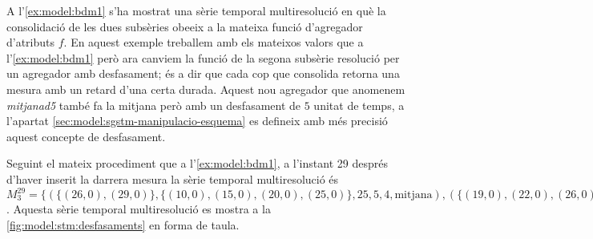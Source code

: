 \begin{example} 
\label{ex:model:bdm-desfasaments}

A l'\autoref{ex:model:bdm1} s'ha mostrat una sèrie temporal
multiresolució en què la consolidació de les dues subsèries obeeix
a la mateixa funció d'agregador d'atributs $f$. En aquest exemple
treballem amb els mateixos valors que a l'\autoref{ex:model:bdm1} però
ara canviem la funció de la segona subsèrie resolució per un agregador
amb desfasament; és a dir que cada cop que consolida retorna una
mesura amb un retard d'una certa durada. Aquest nou agregador que
anomenem \emph{mitjanad5} també fa la mitjana però amb un desfasament
de $5$ unitat de temps, a l'apartat
\ref{sec:model:sgstm-manipulacio-esquema} es defineix amb més precisió
aquest concepte de desfasament.


Seguint el mateix procediment que a l'\autoref{ex:model:bdm1}, a
l'instant 29 després d'haver inserit la darrera mesura la sèrie
temporal multiresolució és $M_3^{29} = \{ ( \{(26,0),(29,0)\} ,
\{(10,0),(15,0),(20,0),(25,0)\} , 25 , 5 ,4 , \text{mitjana} ) , (
\{(19,0),(22,0),(26,0),(29,0)\} , \{(5,0),(15,0)\} , 20 , 10 ,3 ,
\text{mitjanad5} ) \}$.  Aquesta sèrie temporal multiresolució es
mostra a la \autoref{fig:model:stm:desfasaments} en forma de taula.



\end{example}
